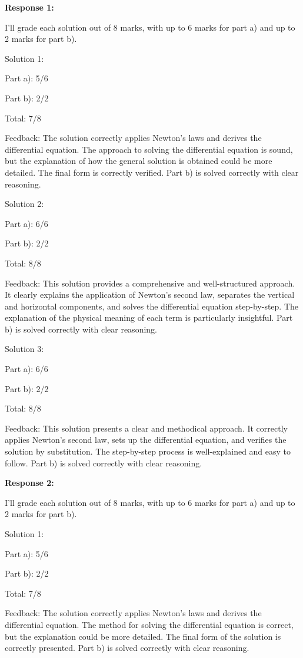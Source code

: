 \documentclass[a4paper,11pt]{article}
\begin{document}
\textbf{Response 1:}

I'll grade each solution out of 8 marks, with up to 6 marks for part a) and up to 2 marks for part b).

Solution 1:

Part a): 5/6

Part b): 2/2

Total: 7/8

Feedback: The solution correctly applies Newton's laws and derives the differential equation. The approach to solving the differential equation is sound, but the explanation of how the general solution is obtained could be more detailed. The final form is correctly verified. Part b) is solved correctly with clear reasoning.

Solution 2:

Part a): 6/6

Part b): 2/2

Total: 8/8

Feedback: This solution provides a comprehensive and well-structured approach. It clearly explains the application of Newton's second law, separates the vertical and horizontal components, and solves the differential equation step-by-step. The explanation of the physical meaning of each term is particularly insightful. Part b) is solved correctly with clear reasoning.

Solution 3:

Part a): 6/6

Part b): 2/2

Total: 8/8

Feedback: This solution presents a clear and methodical approach. It correctly applies Newton's second law, sets up the differential equation, and verifies the solution by substitution. The step-by-step process is well-explained and easy to follow. Part b) is solved correctly with clear reasoning.

\bigskip
\textbf{Response 2:}

I'll grade each solution out of 8 marks, with up to 6 marks for part a) and up to 2 marks for part b).

Solution 1:

Part a): 5/6

Part b): 2/2

Total: 7/8

Feedback: The solution correctly applies Newton's laws and derives the differential equation. The method for solving the differential equation is correct, but the explanation could be more detailed. The final form of the solution is correctly presented. Part b) is solved correctly with clear reasoning.
\end{document}
